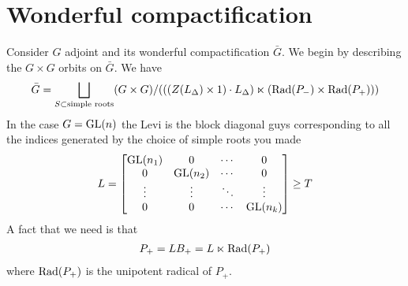 \documentclass[12pt]{article}
\begin{document}
\section{Wonderful compactification}
Consider $G$ adjoint and its wonderful compactification $\bar G$. We begin by describing the $G\times G$ orbits
on $\bar G$. We have \begin{align*}
	\bar G = \bigsqcup_{S\subset \text{simple roots}} (G\times G)/(((Z(L_\Delta)\times 1)\cdot L_\Delta) \ltimes (\operatorname{Rad}(P_-)\times \operatorname{Rad}(P_+)))
\end{align*} In the case $G = \operatorname{GL}(n)$ the Levi is the block diagonal guys corresponding to all the indices
generated by the choice of simple roots you made \begin{align*}
	L = \begin{bmatrix}
		    \operatorname{GL}(n_1) & 0        & \cdots & 0        \\
		    0        & \operatorname{GL}(n_2) & \cdots & 0        \\
		    \vdots   & \vdots   & \ddots & \vdots   \\
		    0        & 0        & \cdots & \operatorname{GL}(n_k)
	    \end{bmatrix} \geq T
\end{align*}
A fact that we need is that \begin{align*}
	P_+ & = LB_+ = L \ltimes \operatorname{Rad}(P_+) \\
\end{align*} where $\operatorname{Rad}(P_+)$ is the unipotent radical of $P_+$.
\end{document}
